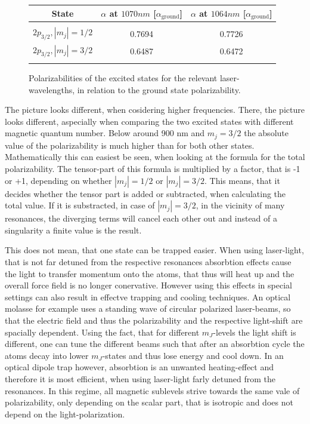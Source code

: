 \begin{figure}[h]
\begin{center}
\begin{tabular}{ccc}
State&$\alpha$ at $1070\unit{nm}$ [$\alpha_{\mathrm{ground}}$]&$\alpha$ at $1064\unit{nm}$ [$\alpha_{\mathrm{ground}}$]\\\hline\hline\\
$2p_{3/2}, |m_j|=1/2$&0.7694&0.7726\\
$2p_{3/2}, |m_j|=3/2$&0.6487&0.6472\\
\\\hline
\end{tabular}
\end{center}
\caption{Polarizabilities of the excited states for the relevant laser-wavelengths, in relation to the ground state polarizability.}
\label{relativealpha}
\end{figure}

The picture looks different, when cosidering higher frequencies. There, the picture looks different, aspecially when comparing the two excited states with different magnetic quantum number. Below around 900 nm and $m_j=3/2$ the absolute value of the polarizability is much higher than for both other states. Mathematically this can easiest be seen, when looking at the formula for the total polarizability. The tensor-part of this formula is multiplied by a factor, that is -1 or +1, depending on whether $|m_j|=1/2$ or $|m_j|=3/2$. This means, that it decides whether the tensor part is added or subtracted, when calculating the total value. If it is substracted, in case of $|m_j|=3/2$, in the vicinity of many resonances, the diverging terms will cancel each other out and instead of a singularity a finite value is the result.

This does not mean, that one state can be trapped easier. When using laser-light, that is not far detuned from the respective resonances absorbtion effects cause the light to transfer momentum onto the atoms, that thus will heat up and the overall force field is no longer conervative. However using this effects in special settings can also result in effectve trapping and cooling techniques. An optical molasse for example uses a standing wave of circular polarized laser-beams, so that the electric field and thus the polarizability and the respective light-shift are spacially dependent. Using the fact, that for different $m_J$-levels the light shift is different, one can tune the different beams such that after an absorbtion cycle the atoms decay into lower $m_J$-states and thus lose energy and cool down. In an optical dipole trap however, absorbtion is an unwanted heating-effect and therefore it is most efficient, when using laser-light farly detuned from the resonances. In this regime, all magnetic sublevels strive towards the same vale of polarizability, only depending on the scalar part, that is isotropic and does not depend on the light-polarization.

